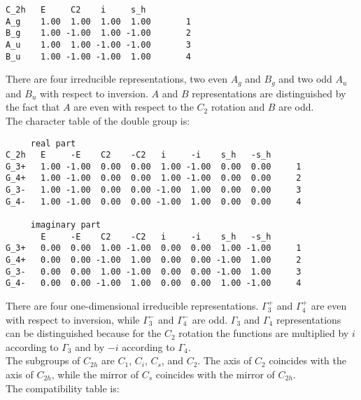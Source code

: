 \documentclass[12pt,a4paper,twoside]{report}
\begin{document}
\begin{tcolorbox}
\begin{footnotesize}
\begin{verbatim}
C_2h   E     C2    i     s_h
A_g    1.00  1.00  1.00  1.00       1
B_g    1.00 -1.00  1.00 -1.00       2
A_u    1.00  1.00 -1.00 -1.00       3
B_u    1.00 -1.00 -1.00  1.00       4
\end{verbatim}
\end{footnotesize}
\end{tcolorbox}

There are four irreducible representations, two even $A_g$ and $B_g$ and
two odd $A_u$ and $B_u$ with respect to inversion. $A$ and $B$ representations
are distinguished by the fact that $A$ are even with respect
to the $C_2$ rotation and $B$ are odd. \\
The character table of the double group is:

\begin{tcolorbox}
\begin{footnotesize}
\begin{verbatim}
     real part
C_2h   E     -E    C2    -C2   i     -i    s_h   -s_h 
G_3+   1.00 -1.00  0.00  0.00  1.00 -1.00  0.00  0.00     1
G_4+   1.00 -1.00  0.00  0.00  1.00 -1.00  0.00  0.00     2
G_3-   1.00 -1.00  0.00  0.00 -1.00  1.00  0.00  0.00     3
G_4-   1.00 -1.00  0.00  0.00 -1.00  1.00  0.00  0.00     4

     imaginary part
       E     -E    C2    -C2   i     -i    s_h   -s_h 
G_3+   0.00  0.00  1.00 -1.00  0.00  0.00  1.00 -1.00     1
G_4+   0.00  0.00 -1.00  1.00  0.00  0.00 -1.00  1.00     2
G_3-   0.00  0.00  1.00 -1.00  0.00  0.00 -1.00  1.00     3
G_4-   0.00  0.00 -1.00  1.00  0.00  0.00  1.00 -1.00     4
\end{verbatim}
\end{footnotesize}
\end{tcolorbox}

There are four one-dimensional irreducible representations. $\Gamma_3^+$
and $\Gamma_4^+$ are even with respect to inversion, while
$\Gamma_3^-$ and $\Gamma_4^-$ are odd. $\Gamma_3$ and $\Gamma_4$ 
representations can be distinguished because for the $C_2$ rotation
the functions are multiplied by $i$ according to $\Gamma_3$ and 
by $-i$ according to $\Gamma_4$. \\
The subgroups of $C_{2h}$ are $C_1$, $C_i$, $C_s$, and $C_2$. The
axis of $C_2$ coincides with the axis of $C_{2h}$, while the 
mirror of $C_s$ coincides with the mirror of $C_{2h}$.\\
The compatibility table is:
\end{document}
